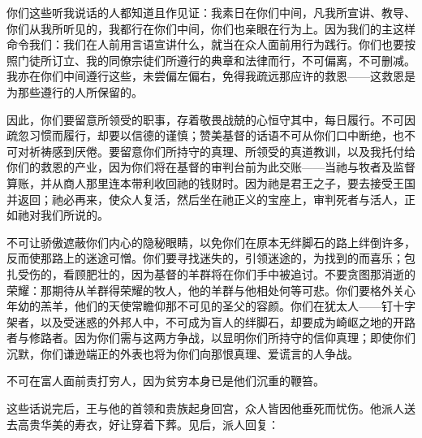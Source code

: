 你们这些听我说话的人都知道且作见证：我素日在你们中间，凡我所宣讲、教导、你们从我所听见的，我都行在你们中间，你们也亲眼在行为上。因为我们的主这样命令我们：我们在人前用言语宣讲什么，就当在众人面前用行为践行。你们也要按照门徒所订立、我的同僚宗徒们所遵行的典章和法律而行，不可偏离，不可删减。我亦在你们中间遵行这些，未尝偏左偏右，免得我疏远那应许的救恩——这救恩是为那些遵行的人所保留的。\par

因此，你们要留意所领受的职事，存着敬畏战兢的心恒守其中，每日履行。不可因疏忽习惯而履行，却要以信德的谨慎；赞美基督的话语不可从你们口中断绝，也不可对祈祷感到厌倦。要留意你们所持守的真理、所领受的真道教训，以及我托付给你们的救恩的产业，因为你们将在基督的审判台前为此交账——当祂与牧者及监督算账，并从商人那里连本带利收回祂的钱财时。因为祂是君王之子，要去接受王国并返回；祂必再来，使众人复活，然后坐在祂正义的宝座上，审判死者与活人，正如祂对我们所说的。\par

不可让骄傲遮蔽你们内心的隐秘眼睛，以免你们在原本无绊脚石的路上绊倒许多，反而使那路上的迷途可憎。你们要寻找迷失的，引领迷途的，为找到的而喜乐；包扎受伤的，看顾肥壮的，因为基督的羊群将在你们手中被追讨。不要贪图那消逝的荣耀：那期待从羊群得荣耀的牧人，他的羊群与他相处何等可悲。你们要格外关心年幼的羔羊，他们的天使常瞻仰那不可见的圣父的容颜。你们在犹太人——钉十字架者，以及受迷惑的外邦人中，不可成为盲人的绊脚石，却要成为崎岖之地的开路者与修路者。因为你们需与这两方争战，以显明你们所持守的信仰真理；即使你们沉默，你们谦逊端正的外表也将为你们向那恨真理、爱谎言的人争战。\par

不可在富人面前责打穷人，因为贫穷本身已是他们沉重的鞭笞。\par

\par

这些话说完后，王与他的首领和贵族起身回宫，众人皆因他垂死而忧伤。他派人送去高贵华美的寿衣，好让穿着下葬。见后，派人回复：\par

